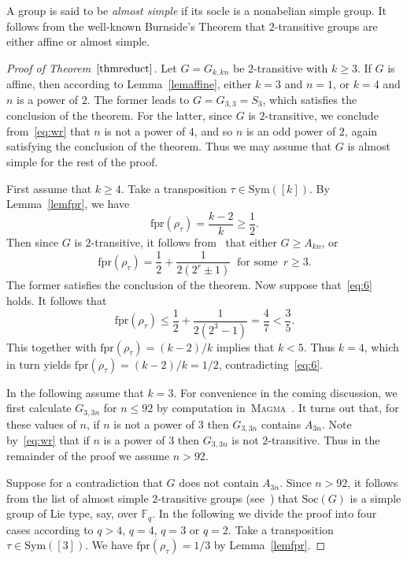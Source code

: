 \documentclass[11pt,a4paper,reqno]{amsart}
\newcommand{\A}{A}
\newcommand{\fpr}{\mathrm{fpr}}
\newcommand{\Soc}{\mathrm{Soc}}
\newcommand{\Sym}{\mathrm{Sym}}
\newcommand{\Sy}{S}
\theoremstyle{definition}
\begin{document}
A group is said to be \emph{almost simple} if its socle is a nonabelian simple group. It follows from the well-known Burnside's Theorem \cite[\S 154, Theorem XIII]{B1911} that $2$-transitive groups are either affine or almost simple.

\begin{proof}[Proof of Theorem~$\ref{thmreduct}$]
Let $G=G_{k,kn}$ be $2$-transitive with $k\geq3$. If $G$ is affine, then according to Lemma~\ref{lemaffine}, either $k=3$ and $n=1$, or $k=4$ and $n$ is a power of $2$. The former leads to $G=G_{3,3}=\Sy_3$, which satisfies the conclusion of the theorem. For the latter, since $G$ is $2$-transitive, we conclude from~\eqref{eq:wr} that $n$ is not a power of $4$, and so $n$ is an odd power of $2$, again satisfying the conclusion of the theorem. Thus we may assume that $G$ is almost simple for the rest of the proof.

First assume that $k\geq4$. Take a transposition $\tau\in\Sym([k])$. By Lemma~\ref{lemfpr}, we have
\[
\fpr(\rho_\tau)=\frac{k-2}{k}\geq\frac{1}{2}.
\]
Then since $G$ is $2$-transitive, it follows from~\cite[Theorem~1]{GM1998} that either $G\geq\A_{kn}$, or
\begin{equation}\label{eq:6}
\fpr(\rho_\tau)=\frac{1}{2}+\frac{1}{2(2^r\pm1)}\ \text{ for some }\,r\geq3.
\end{equation}
The former satisfies the conclusion of the theorem. Now suppose that~\eqref{eq:6} holds. It follows that
\[
\fpr(\rho_\tau)\leq\frac{1}{2}+\frac{1}{2(2^3-1)}=\frac{4}{7}<\frac{3}{5}.
\]
This together with $\fpr(\rho_\tau)=(k-2)/k$ implies that $k<5$. Thus $k=4$, which in turn yields $\fpr(\rho_\tau)=(k-2)/k=1/2$, contradicting~\eqref{eq:6}.

In the following assume that $k=3$. For convenience in the coming discussion, we first calculate $G_{3,3n}$ for $n\leq92$ by computation in~\textsc{Magma}~\cite{Magma}. It turns out that, for these values of $n$, if $n$ is not a power of $3$ then $G_{3,3n}$ contains $\A_{3n}$. Note by~\eqref{eq:wr} that if $n$ is a power of $3$ then $G_{3,3n}$ is not $2$-transitive. Thus in the remainder of the proof we assume $n>92$.

Suppose for a contradiction that $G$ does not contain $\A_{3n}$. Since $n>92$, it follows from the list of almost simple $2$-transitive groups (see~\cite[Table~7.4]{Cameron1999}) that $\Soc(G)$ is a simple group of Lie type, say, over $\mathbb{F}_q$. In the following we divide the proof into four cases according to $q>4$, $q=4$, $q=3$ or $q=2$. Take a transposition $\tau\in\Sym([3])$. We have  $\fpr(\rho_\tau)=1/3$ by Lemma~\ref{lemfpr}.


\end{proof}
\end{document}

